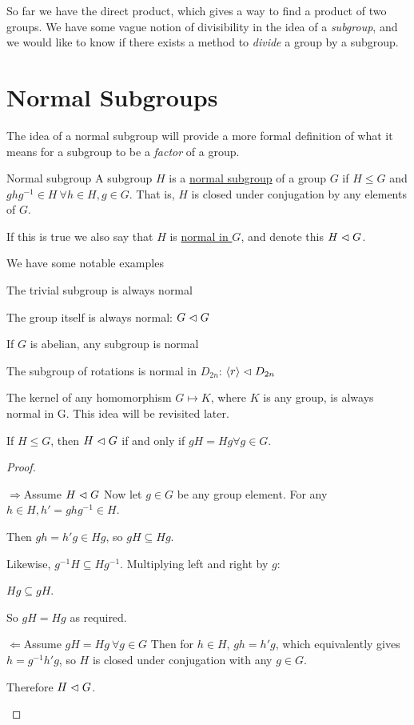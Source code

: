\documentclass[../Main.tex]{subfiles}
\begin{document}
So far we have the direct product, which gives a way to find a product of two groups. We have some vague notion of divisibility in the idea of a \textit{subgroup}, and we would like to know if there exists a method to \textit{divide} a group by a subgroup.
\section{Normal Subgroups}
The idea of a normal subgroup will provide a more formal definition of what it means for a subgroup to be a \textit{factor} of a group.
\begin{definition}{Normal subgroup}
    A subgroup $H$ is a \underline{normal subgroup} of a group $G$ if $H \leq G$ and $ghg^{-1} \in H~\forall h \in H, g \in G$. That is, $H$ is closed under conjugation by any elements of $G$.\par
    If this is true we also say that $H$ is \underline{normal in $G$}, and denote this $H \vartriangleleft G$.
\end{definition}
\begin{examples}{
        We have some notable examples
    }
    \item The trivial subgroup is always normal
    \item The group itself is always normal: $G \vartriangleleft G$
    \item If $G$ is abelian, any subgroup is normal
    \item The subgroup of rotations is normal in $D_{2n}$: $\langle r \rangle \vartriangleleft D_{2n}$ \label{exRotNormalInD2n}
    \item The kernel of any homomorphism $G \mapsto K$, where $K$ is any group, is always normal in G. This idea will be revisited later.
\end{examples}
\begin{lemma}
    If $H \leq G$, then $H \vartriangleleft G$ if and only if $gH = Hg \forall g \in G$.
    \label{lemNormalEquivCosets}
\end{lemma}
\begin{proof}
    \begin{proofdirection}{$\Rightarrow$}{Assume $H \vartriangleleft G$}
        Now let $g \in G$ be any group element. For any $h \in H, h' = ghg^{-1} \in H$.\par
        Then $gh = h'g \in Hg$, so $gH \subseteq Hg$.\par
        Likewise, $g^{-1} H \subseteq H g^{-1}$. Multiplying left and right by $g$:\par
        $Hg \subseteq gH$.\par
        So $gH = Hg$ as required.
    \end{proofdirection}
    \begin{proofdirection}{$\Leftarrow$}{Assume $gH = Hg~\forall g \in G$}
        Then for $h \in H$, $gh = h'g$, which equivalently gives $h = g^{-1} h' g$, so $H$ is closed under conjugation with any $g \in G$.\par
        Therefore $H \vartriangleleft G$.        
    \end{proofdirection}
\end{proof}
\end{document}
